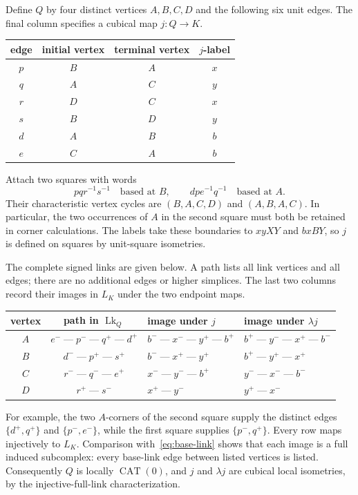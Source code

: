 \documentclass[11pt]{article}
\newcommand{\lk}{\operatorname{Lk}}
\newcommand{\CAT}{\operatorname{CAT}}
\newcommand{\edge}{\mathbin{\text{---}}}
\begin{document}
Define $Q$ by four distinct vertices $A,B,C,D$ and the following six unit
edges. The final column specifies a cubical map $j:Q\to K$.
\begin{center}
\begin{tabular}{cccc}
\toprule
edge & initial vertex & terminal vertex & $j$-label\\
\midrule
$p$ & $B$ & $A$ & $x$\\
$q$ & $A$ & $C$ & $y$\\
$r$ & $D$ & $C$ & $x$\\
$s$ & $B$ & $D$ & $y$\\
$d$ & $A$ & $B$ & $b$\\
$e$ & $C$ & $A$ & $b$\\
\bottomrule
\end{tabular}
\end{center}
Attach two squares with words
\begin{equation}\label{eq:Q}
 pqr^{-1}s^{-1}\quad\text{based at }B,
 \qquad dpe^{-1}q^{-1}\quad\text{based at }A.
\end{equation}
Their characteristic vertex cycles are $(B,A,C,D)$ and $(A,B,A,C)$.
In particular, the two occurrences of $A$ in the second square must both
be retained in corner calculations. The labels take these boundaries to
$xyXY$ and $bxBY$, so $j$ is defined on squares by unit-square isometries.

The complete signed links are given below. A path lists all link vertices
and all edges; there are no additional edges or higher simplices. The last
two columns record their images in $L_K$ under the two endpoint maps.
\begin{center}
\small
\setlength{\tabcolsep}{4pt}
\begin{tabular}{ccll}
\toprule
vertex & path in $\lk_Q$ & image under $j$ & image under $\lambda j$\\
\midrule
$A$ & $e^-\edge p^-\edge q^+\edge d^+$
 & $b^-\edge x^-\edge y^+\edge b^+$
 & $b^+\edge y^-\edge x^+\edge b^-$\\
$B$ & $d^-\edge p^+\edge s^+$
 & $b^-\edge x^+\edge y^+$
 & $b^+\edge y^+\edge x^+$\\
$C$ & $r^-\edge q^-\edge e^+$
 & $x^-\edge y^-\edge b^+$
 & $y^-\edge x^-\edge b^-$\\
$D$ & $r^+\edge s^-$
 & $x^+\edge y^-$
 & $y^+\edge x^-$\\
\bottomrule
\end{tabular}
\end{center}
For example, the two $A$-corners of the second square supply the distinct
edges $\{d^+,q^+\}$ and $\{p^-,e^-\}$, while the first square supplies
$\{p^-,q^+\}$. Every row maps injectively to $L_K$. Comparison
with~\eqref{eq:base-link} shows that each image is a full induced
subcomplex: every base-link edge between listed vertices is listed.
Consequently $Q$ is locally $\CAT(0)$, and $j$ and $\lambda j$ are
cubical local isometries, by the injective-full-link characterization.
\end{document}

